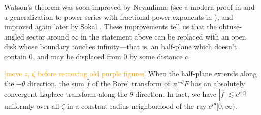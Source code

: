 \documentclass{article}
\newcommand{\aexp}{\text{\ae}}
\theoremstyle{definition}
\theoremstyle{plain}
\begin{document}
Watson's theorem was soon improved by Nevanlinna \cite{nevanlinna} (see a modern proof in \cite[Theorem~B.15]{nikolaev2023exact} and a generalization to power series with fractional power exponents in \cite{delabaere--rosoamanana}), and improved again later by Sokal \cite{sokal1980improvement}. These improvements tell us that the obtuse-angled sector around $\infty$ in the statement above can be replaced with an open disk whose boundary touches infinity---that is, an half-plane which doesn't contain $0$, and may be displaced from $0$ by some distance $c$.
\begin{center}
\end{center}
\textcolor{orange}{[move $z$, $\zeta$ before removing old purple figures]} When the half-plane extends along the $-\theta$ direction, the sum $\hat{f}$ of the Borel transform of $\aexp^{-\theta} F$ has an absolutely convergent Laplace transform along the $\theta$ direction. In fact, we have $|\hat{f}| \lesssim e^{c |\zeta|}$ uniformly over all $\zeta$ in a constant-radius neighborhood of the ray $e^{i\theta}[0, \infty)$. 
\end{document}
